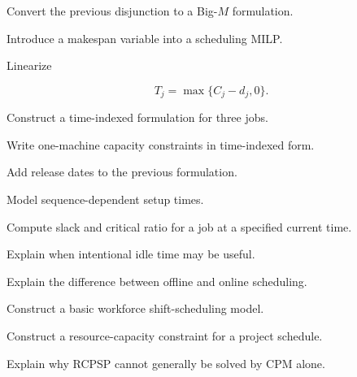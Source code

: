 \begin{exercise}[3]
Convert the previous disjunction to a Big-\(M\) formulation.
\end{exercise}

\begin{exercise}[3]
Introduce a makespan variable into a scheduling MILP.
\end{exercise}

\begin{exercise}[3]
Linearize

\[
T_j
=
\max
\{
C_j-d_j,0
\}.
\]
\end{exercise}

\begin{exercise}[3]
Construct a time-indexed formulation for three jobs.
\end{exercise}

\begin{exercise}[3]
Write one-machine capacity constraints in time-indexed form.
\end{exercise}

\begin{exercise}[3]
Add release dates to the previous formulation.
\end{exercise}

\begin{exercise}[3]
Model sequence-dependent setup times.
\end{exercise}

\begin{exercise}[3]
Compute slack and critical ratio for a job at a specified current time.
\end{exercise}

\begin{exercise}[3]
Explain when intentional idle time may be useful.
\end{exercise}

\begin{exercise}[3]
Explain the difference between offline and online scheduling.
\end{exercise}

\begin{exercise}[3]
Construct a basic workforce shift-scheduling model.
\end{exercise}

\begin{exercise}[3]
Construct a resource-capacity constraint for a project schedule.
\end{exercise}

\begin{exercise}[3]
Explain why RCPSP cannot generally be solved by CPM alone.
\end{exercise}

